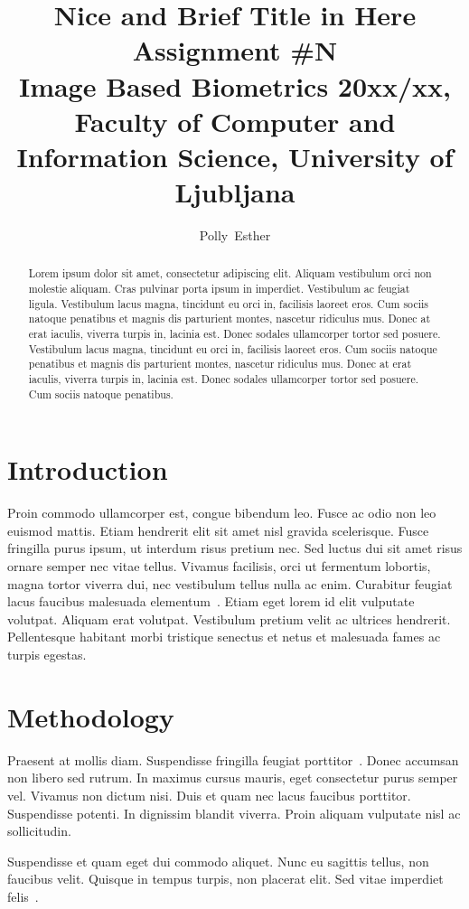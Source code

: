 \documentclass[9pt]{IEEEtran}
\title{\vspace{0ex} %
Nice and Brief Title in Here
\\ \large{Assignment \#N}\\ \normalsize{Image Based Biometrics 20xx/xx, Faculty of Computer and Information Science, University of Ljubljana}}
\author{ %
Polly~Esther
\vspace{-4.0ex}
}
\begin{document}
\maketitle

\begin{abstract}
Lorem ipsum dolor sit amet, consectetur adipiscing elit. Aliquam vestibulum orci non molestie aliquam. Cras pulvinar porta ipsum in imperdiet. Vestibulum ac feugiat ligula. Vestibulum lacus magna, tincidunt eu orci in, facilisis laoreet eros. Cum sociis natoque penatibus et magnis dis parturient montes, nascetur ridiculus mus. Donec at erat iaculis, viverra turpis in, lacinia est. Donec sodales ullamcorper tortor sed posuere. Vestibulum lacus magna, tincidunt eu orci in, facilisis laoreet eros. Cum sociis natoque penatibus et magnis dis parturient montes, nascetur ridiculus mus. Donec at erat iaculis, viverra turpis in, lacinia est. Donec sodales ullamcorper tortor sed posuere. Cum sociis natoque penatibus.
\end{abstract}

\section{Introduction}
Proin commodo ullamcorper est, congue bibendum leo. Fusce ac odio non leo euismod mattis. Etiam hendrerit elit sit amet nisl gravida scelerisque. Fusce fringilla purus ipsum, ut interdum risus pretium nec. Sed luctus dui sit amet risus ornare semper nec vitae tellus. Vivamus facilisis, orci ut fermentum lobortis, magna tortor viverra dui, nec vestibulum tellus nulla ac enim. Curabitur feugiat lacus faucibus malesuada elementum~\cite{neurocomputing4,neurocomputing5}. Etiam eget lorem id elit vulputate volutpat. Aliquam erat volutpat. Vestibulum pretium velit ac ultrices hendrerit. Pellentesque habitant morbi tristique senectus et netus et malesuada fames ac turpis egestas.

\section{Methodology}
Praesent at mollis diam. Suspendisse fringilla feugiat porttitor~\cite{neuro2008,neuro2013}. Donec accumsan non libero sed rutrum. In maximus cursus mauris, eget consectetur purus semper vel. Vivamus non dictum nisi. Duis et quam nec lacus faucibus porttitor. Suspendisse potenti. In dignissim blandit viverra. Proin aliquam vulputate nisl ac sollicitudin.

 Suspendisse et quam eget dui commodo aliquet. Nunc eu sagittis tellus, non faucibus velit. Quisque in tempus turpis, non placerat elit. Sed vitae imperdiet felis~\cite{Jain2004,Jain2011}.
\end{document}
